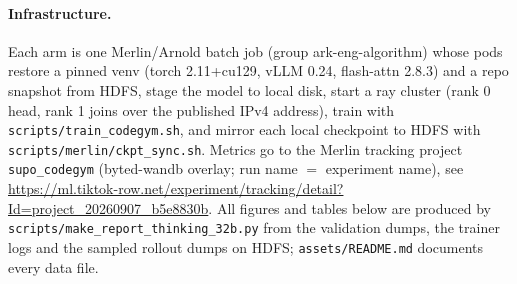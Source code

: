 \documentclass[11pt]{article}
\newcommand{\p}[1]{\texttt{#1}}
\begin{document}
\paragraph{Infrastructure.} Each arm is one Merlin/Arnold batch job (group ark-eng-algorithm) whose pods restore a pinned venv (torch 2.11+cu129, vLLM 0.24, flash-attn 2.8.3) and a repo snapshot from HDFS, stage the model to local disk, start a ray cluster (rank 0 head, rank 1 joins over the published IPv4 address), train with \p{scripts/train\_codegym.sh}, and mirror each local checkpoint to HDFS with \p{scripts/merlin/ckpt\_sync.sh}. Metrics go to the Merlin tracking project \p{supo\_codegym} (byted-wandb overlay; run name $=$ experiment name), see \url{https://ml.tiktok-row.net/experiment/tracking/detail?Id=project_20260907_b5e8830b}. All figures and tables below are produced by \p{scripts/make\_report\_thinking\_32b.py} from the validation dumps, the trainer logs and the sampled rollout dumps on HDFS; \p{assets/README.md} documents every data file.
\end{document}

